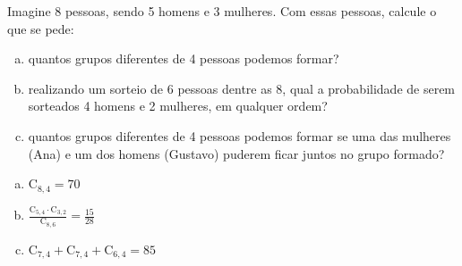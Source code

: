 \begin{ex}
Imagine 8 pessoas, sendo 5 homens e 3 mulheres. Com essas pessoas, calcule o que se          pede:
   \begin{enumerate}[(a)]
   \item quantos grupos diferentes de 4 pessoas podemos formar?
   \item realizando um sorteio de 6 pessoas dentre as 8, qual a probabilidade de serem sorteados 4 homens e 2 mulheres, em qualquer ordem?
   \item  quantos grupos diferentes de 4 pessoas podemos formar se uma das mulheres (Ana) e um dos homens (Gustavo) puderem ficar juntos no grupo formado?
   \end{enumerate}
     \begin{sol}
      \phantom{A}
       \begin{enumerate} [(a)]
           \item $\mathrm{C}_{8,4}=70$
           \item $\frac{\mathrm{C}_{5,4}\cdot\mathrm{C}_{3,2}}{\mathrm{C}_{8,6}}=\frac{15}{28}$
           \item $\mathrm{C}_{7,4}+\mathrm{C}_{7,4}+\mathrm{C}_{6,4}=85$
       \end{enumerate}
     \end{sol}
\end{ex}